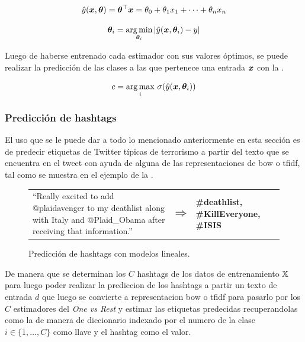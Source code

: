\begin{equation} \label{eq:linear-regression-training}
  \hat{y}({\bm{x}}, {\bm{\theta}}) = {\bm{\theta}}^{\top} {\bm{x}} = \theta_0 + \theta_1 x_1 + \cdots + \theta_n x_n
\end{equation}

\begin{equation} \label{eq:linear-regression-estimation}
  {\bm{\theta}}_i = \operatorname*{arg\,min}_{{\bm{\theta}}_i} | \hat{y}({\bm{x}}, {\bm{\theta}}_i) - y|
\end{equation}

Luego de haberse entrenado cada estimador con sus valores óptimos, se puede realizar la predicción de las clases a las que pertenece una entrada ${\bm{x}}$ con la .

\begin{equation} \label{eq:ovr-prediction}
  c = \operatorname*{arg\,max}_i \, \sigma(\hat{y}({\bm{x}}, {\bm{\theta}}_i))
\end{equation}

\subsubsection{Predicción de hashtags}
El uso que se le puede dar a todo lo mencionado anteriormente en esta sección es de predecir etiquetas de Twitter típicas de terrorismo a partir del texto que se encuentra en el tweet con ayuda de alguna de las representaciones de \gls{bow} o \gls{tfidf}, tal como se muestra en el ejemplo de la .

\begin{figure}[H]
  \centering
  \begin{tabular}{p{} p{} p{}}
    ``Really excited to add @plaidavenger to my deathlist along with Italy and @Plaid\_Obama after receiving that information.'' & $\mathlarger{\mathlarger{\mathlarger{\Rightarrow}}}$ & \textbf{\#deathlist, \#KillEveryone, \#ISIS}
  \end{tabular}
  \decoRule
  \caption{Predicción de hashtags con modelos lineales.}
  \label{fig:tweet-prediction}
\end{figure}

De manera que se determinan los $C$ hashtags de los datos de entrenamiento ${\mathbb{X}}$ para luego poder realizar la prediccion de los hashtags a partir un texto de entrada $d$ que luego se convierte a representacion \gls{bow} o \gls{tfidf} para pasarlo por los $C$ estimadores del \emph{One vs Rest} y estimar las etiquetas predecidas recuperandolas como la  de manera de diccionario indexado por el numero de la clase $i \in \{1, \ldots, C\}$ como llave y el hashtag como el valor.

